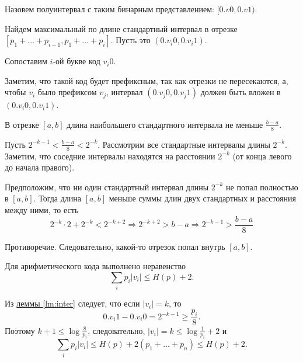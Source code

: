 Назовем  полуинтервал с таким бинарным представлением: $ \bigl[\overline{0. v 0}, \overline{0. v 1}\bigr)$. 

Найдем максимальный по длине стандартный интервал в отрезке $[p_1 + \dots +p_{i-1}, p_1 + \dots + p_i]$. Пусть это $ (0.v_i 0, 0.v_i 1)$.

Сопоставим $ i$-ой букве код $ v_i 0$.

Заметим, что такой код будет префиксным, так как отрезки не пересекаются, а, чтобы $ v_i$ было префиксом $ v_j$, интервал  $ (0.v_j 0, 0.v_j 1)$ должен быть вложен в $ (0.v_i 0, 0.v_i 1)$.

\begin{lm}\label{lm:inter}
	В отрезке $ [a, b]$ длина наибольшего стандартного интервала не меньше $ \frac{b-a}{8}$.
\end{lm}
\begin{proof*}
	Пусть $ 2^{-k-1} < \frac{b-a}{8} < 2^{-k}$.
	Рассмотрим все стандартные интервалы длины $ 2^{-k}$. Заметим, что соседние интервалы находятся на расстоянии $ 2^{-k}$ (от конца левого до начала правого).

	Предположим, что ни один стандартный интервал длины $ 2^{-k}$ не попал полностью в $ [a, b]$. Тогда длина  $ [a, b]$ меньше суммы длин двух стандартных и расстояния между ними,
	то есть $$ 2^{-k} \cdot 2 + 2^{-k} < 2^{-k + 2} \Longrightarrow 2^{-k + 2} > b - a \Longrightarrow 2^{-k - 1} > \frac{b - a}{8}$$

	Противоречие. Следовательно, какой-то отрезок попал внутрь $ [a, b]$.
\end{proof*}
\begin{thm}
    Для арифметического кода выполнено неравенство
	\[
		\sum_{i} p_i \lvert v_i \rvert  \le H(p) + 2
	.\] 
\end{thm}
\begin{proof*}
	Из \hyperref[lm:inter]{леммы \ref{lm:inter}} следует, что если $ \lvert v_i \rvert = k$, то 
	\[
		0.v_i 1 - 0.v_i 0 = 2^{-k-1} \ge \frac{p_i}{ 8}
	.\] 
	Поэтому $ k+1 \le \log \frac{8}{p_i}$, следовательно, $ \lvert v_i \rvert = k \le \log \frac{1}{p_i} + 2$ и
	\[
		\sum_i p _i \lvert v_i \rvert \le H(p) + 2 (p_1+ \ldots +p_n) \le H(p) + 2
	.\] 
\end{proof*}

